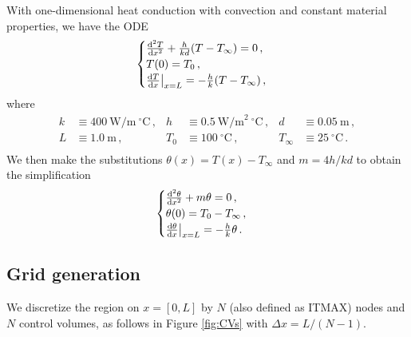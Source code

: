 \documentclass{article}
\begin{document}
With one-dimensional heat conduction with convection and constant material properties, we have the ODE
\begin{equation}
	\begin{cases}
		\dv{^2T}{x^2} + \frac{h}{kd} (T - T_\infty) = 0\,,\\
		T(0) = T_0\,,\\
		\dv{T}{x} \big|_{x = L} = - \frac{h}{k} (T - T_\infty)\,,
	\end{cases}
\end{equation}
where
\begin{align*}
	k & \equiv 400~\text{W/m}~^\circ\text{C}\,, & h & \equiv 0.5~\text{W/m}^2~^\circ\text{C}\,, & d & \equiv 0.05~\text{m}\,,\\
	L & \equiv 1.0~\text{m}\,, & T_0 & \equiv 100~^\circ\text{C}\,, & T_\infty & \equiv 25~^\circ\text{C}\,.\\
\end{align*}
We then make the substitutions $\theta(x) = T(x) - T_\infty$ and $m = 4h/kd$ to obtain the simplification
\begin{equation}
	\begin{cases}
		\dv{^2\theta}{x^2} + m \theta = 0\,,\\
		\theta(0) = T_0 - T_\infty\,,\\
		\dv{\theta}{x} \big|_{x = L} = - \frac{h}{k} \theta\,.
	\end{cases}
	\end{equation}

\subsection*{Grid generation}

We discretize the region on $x = [0, L]$ by $N$ (also defined as ITMAX) nodes and $N$ control volumes, as follows in Figure \ref{fig:CVs} with $\Delta x = L / (N - 1)$.
\end{document}
